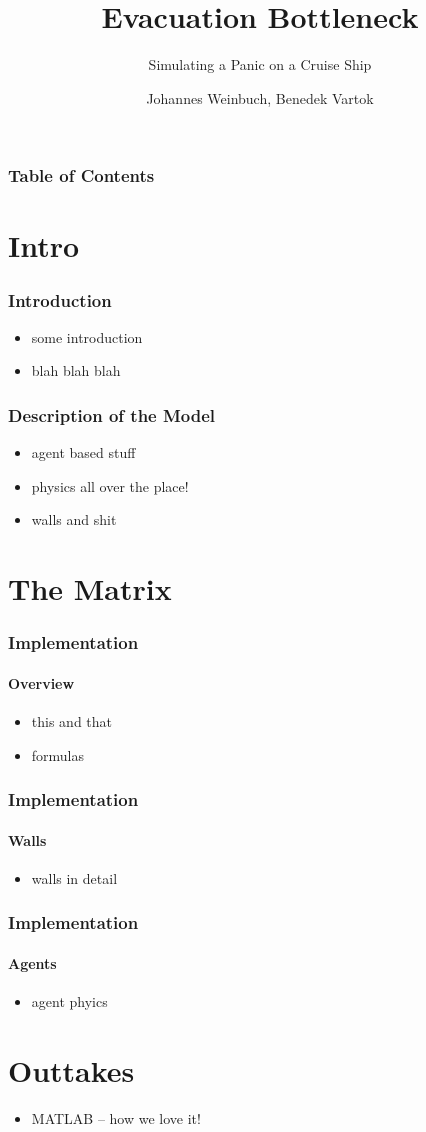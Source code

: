 \documentclass{beamer}
\title{Evacuation Bottleneck}
\subtitle{Simulating a Panic on a Cruise Ship}
\author{Johannes Weinbuch, Benedek Vartok}
\date{}
\begin{document}
 \frame{\titlepage}

 \begin{frame}
	 \frametitle{Table of Contents}
	 \tableofcontents
 \end{frame}
\section{Intro} %
\label{sec:Intro }

 \begin{frame}
  \frametitle{Introduction}
  \begin{itemize}
   \item some introduction
   \item blah blah blah
  \end{itemize}
 \end{frame}
  
 \begin{frame}
  \frametitle{Description of the Model}
  \begin{itemize}
   \item agent based stuff
   \item physics all over the place!
   \item walls and shit
  \end{itemize}
 \end{frame}
 \section{The Matrix} %
 \label{sec:The Matrix }
 
 \begin{frame}
  \frametitle{Implementation}
  \framesubtitle{Overview}
  \begin{itemize}
   \item this and that
   \item formulas
  \end{itemize}
 \end{frame}
 \begin{frame}
  \frametitle{Implementation}
  \framesubtitle{Walls}
   \begin{itemize}
   \item walls in detail
   \end{itemize}
 \end{frame}
 \begin{frame}
  \frametitle{Implementation}
  \framesubtitle{Agents}
   \begin{itemize}
   \item agent phyics
   \end{itemize}
 \end{frame}
\section{Outtakes} %
\label{sec:Outtakes }
\begin{frame}
	\begin{itemize}
		\item MATLAB -- how we love it!
	\end{itemize}
\end{frame}

\end{document}
